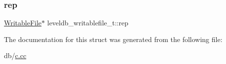 \subsubsection{\texorpdfstring{rep}{rep}}
{\footnotesize\ttfamily \mbox{\hyperlink{classleveldb_1_1_writable_file}{Writable\+File}}$\ast$ leveldb\+\_\+writablefile\+\_\+t\+::rep}



The documentation for this struct was generated from the following file\+:\begin{DoxyCompactItemize}
\item 
db/\mbox{\hyperlink{c_8cc}{c.\+cc}}\end{DoxyCompactItemize}
